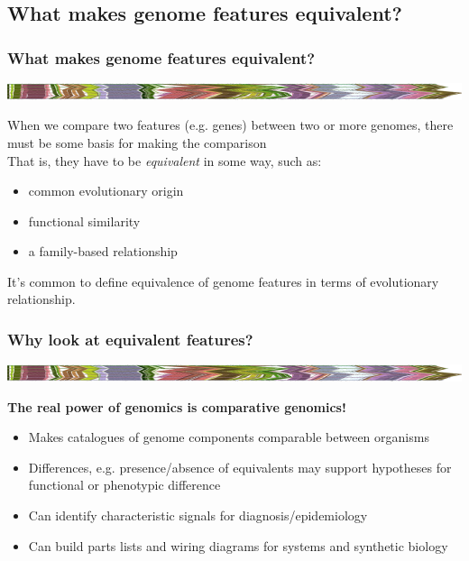 
\subsection{What makes genome features equivalent?}

\begin{frame}
  \frametitle{What makes genome features equivalent?}
  \begin{center}
    \includegraphics[width=1\textwidth]{images/collinear_zeae}  
  \end{center}
  When we compare two features (e.g. genes) between two or more genomes, there must be some basis for making the comparison \\
  That is, they have to be \textit{equivalent} in some way, such as:
  \begin{itemize}
    \item common evolutionary origin
    \item functional similarity
    \item a family-based relationship
  \end{itemize}
  It's common to define equivalence of genome features in terms of evolutionary relationship.
\end{frame}

\begin{frame}
  \frametitle{Why look at equivalent features?}
  \begin{center}
    \includegraphics[width=1\textwidth]{images/collinear_zeae}  
  \end{center}
  \textbf{The real power of genomics is comparative genomics!}
  \begin{itemize}
    \item Makes catalogues of genome components comparable between organisms
    \item Differences, e.g. presence/absence of equivalents may support hypotheses for functional or phenotypic difference
    \item Can identify characteristic signals for diagnosis/epidemiology
    \item Can build parts lists and wiring diagrams for systems and synthetic biology
  \end{itemize}
\end{frame}
